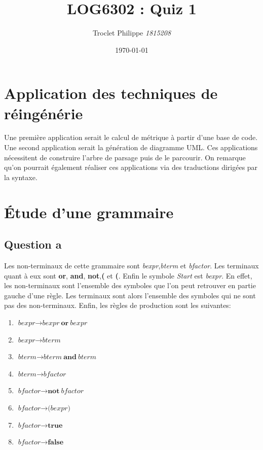 \documentclass{article}
\title{LOG6302 : Quiz 1}
\author{Troclet Philippe \textit{1815208}}
\date{\today}
\begin{document}
	\maketitle
	
\section{Application des techniques de réingénérie}
	Une première application serait le calcul de métrique à partir d'une base de code. Une second application serait la génération de diagramme UML. Ces applications nécessitent de construire l'arbre de parsage puis de le parcourir. On remarque qu'on pourrait également réaliser ces applications via des traductions dirigées par la syntaxe.
\section{\'Etude d'une grammaire}
	\subsection*{Question a}
	 Les non-terminaux de cette grammaire sont \textit{bexpr},\textit{bterm} et \textit{bfactor}. Les terminaux quant à eux sont 
	 \textbf{or}, \textbf{and}, \textbf{not},\textbf{(} et \textbf{(}. Enfin le symbole \textit{Start} est \textit{bexpr}. En effet,
	 les non-terminaux sont l'ensemble des symboles que l'on peut retrouver en partie gauche d'une règle. Les terminaux sont alors l'ensemble des symboles qui ne sont pas des non-terminaux. Enfin, les règles de production sont les suivantes:
	 \begin{enumerate}
		\item $\textit{bexpr} \rightarrow \textit{bexpr}\  \textbf{or}\ \textit{bexpr}$
		\item $\textit{bexpr} \rightarrow \textit{bterm}$
		\item $\textit{bterm} \rightarrow \textit{bterm}\  \textbf{and}\ \textit{bterm}$
		\item $\textit{bterm} \rightarrow \textit{bfactor}$
		\item $\textit{bfactor} \rightarrow \textbf{not}\  \textit{bfactor}$
		\item $\textit{bfactor} \rightarrow \textbf{(} \textit{bexpr} \textbf{)}$
		\item $\textit{bfactor} \rightarrow \textbf{true}$
		\item $\textit{bfactor} \rightarrow \textbf{false}$
	 \end{enumerate}
 
\end{document}
